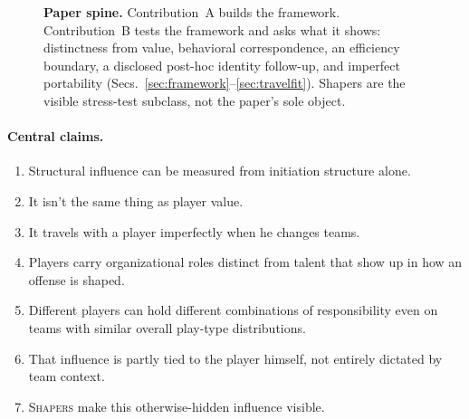 \documentclass[11pt]{article}
\begin{document}
\begin{figure}[H]
 \centering
 \caption{\textbf{Paper spine.} Contribution~A builds the framework. Contribution~B tests
 the framework and asks what it shows: distinctness from value, behavioral correspondence,
 an efficiency boundary, a disclosed post-hoc identity follow-up, and imperfect portability
 (Secs.~\ref{sec:framework}--\ref{sec:travelfit}). Shapers are the visible stress-test
 subclass, not the paper's sole object.}
 \label{fig:spine}
\end{figure}

\paragraph{Central claims.}
\begin{enumerate}[leftmargin=1.6em,itemsep=0.1em]
 \item Structural influence can be measured from initiation structure alone.
 \item It isn't the same thing as player value.
 \item It travels with a player imperfectly when he changes teams.
 \item Players carry organizational roles distinct from talent that show up in how an offense
 is shaped.
 \item Different players can hold different combinations of responsibility even on teams with
 similar overall play-type distributions.
 \item That influence is partly tied to the player himself, not entirely dictated by team
 context.
 \item \textsc{Shapers} make this otherwise-hidden influence visible.
\end{enumerate}
\end{document}
